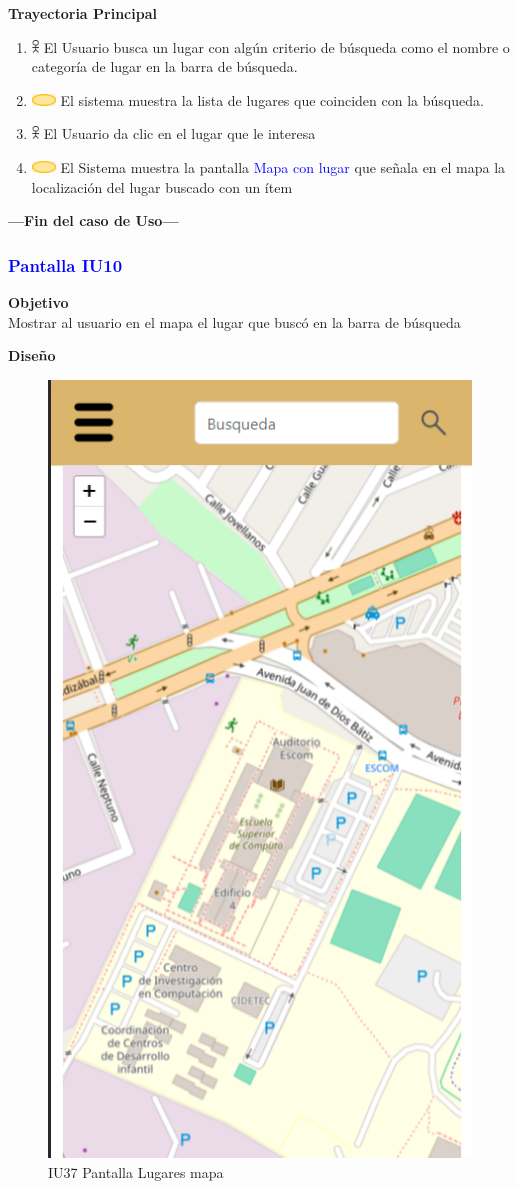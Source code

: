 \textbf{Trayectoria Principal}
\begin{enumerate}
    \item \includegraphics[width=0.0150\textwidth]{Figuras/persona.png} El Usuario busca un lugar con algún criterio de búsqueda como el nombre o categoría de lugar en la barra de búsqueda.
    \item \includegraphics[width=0.0500\textwidth]{Figuras/sistema.png} El sistema muestra la lista de lugares que coinciden con la búsqueda.
    \item \includegraphics[width=0.0150\textwidth]{Figuras/persona.png} El Usuario da clic en el lugar que le interesa
    \item \includegraphics[width=0.0500\textwidth]{Figuras/sistema.png} El Sistema muestra la pantalla \textcolor{blue}{Mapa con lugar} que señala en el mapa la localización del lugar buscado con un ítem
\end{enumerate}
\textbf{---Fin del caso de Uso---}


\subsubsection{\textcolor{blue}{Pantalla IU10}}

\textbf{Objetivo} \\
Mostrar al usuario en el mapa el lugar que buscó en la barra de búsqueda
\vspace{15pt}

\textbf{Diseño}
    \begin{figure}[h]
        
            \centering
            \includegraphics[width=.4\linewidth]{entregable final/pantallasSistema/IU09 Pantalla Mapa principal.png}
    \caption{IU37 Pantalla Lugares mapa}
    
    \end{figure}

